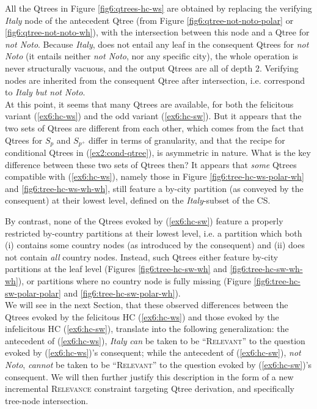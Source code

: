 All the Qtrees in Figure \ref{fig6:qtrees-hc-ws} are obtained by replacing the verifying \textit{Italy} node of the antecedent Qtree (from Figure \ref{fig6:qtree-not-noto-polar} or \ref{fig6:qtree-not-noto-wh}), with the intersection between this node and a Qtree for \textit{\textit{not Noto}}. Because \textit{Italy}, does not entail any leaf in the consequent Qtrees for \textit{not Noto} (it entails neither \textit{not Noto}, nor any specific city), the whole operation is never structurally vacuous, and the output Qtrees are all of depth $2$. Verifying nodes are inherited from the consequent Qtree after intersection, i.e. correspond to \textit{Italy but not Noto}.\\


At this point, it seems that many Qtrees are available, for both the felicitous variant (\ref{ex6:hc-ws}) and the odd variant (\ref{ex6:hc-sw}). But it appears that the two sets of Qtrees are different from each other, which comes from the fact that Qtrees for $S_p$ and $S_{p^+}$ differ in terms of granularity, and that the recipe for conditional Qtrees in (\ref{ex2:cond-qtree}), is asymmetric in nature. What is the key difference between these two sets of Qtrees then? It appears that \textit{some} Qtrees compatible with (\ref{ex6:hc-ws}), namely those in Figure \ref{fig6:tree-hc-ws-polar-wh} and \ref{fig6:tree-hc-ws-wh-wh}, still feature a by-city partition (as conveyed by the consequent) at their lowest level, defined on the \textit{Italy}-subset of the CS.


By contrast, none of the Qtrees evoked by (\ref{ex6:hc-sw}) feature a properly restricted by-country partitions at their lowest level, i.e. a partition which both (i) contains some country nodes (as introduced by the consequent) and (ii) does not contain \textit{all} country nodes. Instead, such Qtrees either feature by-city partitions at the leaf level (Figures \ref{fig6:tree-hc-sw-wh} and \ref{fig6:tree-hc-sw-wh-wh}), or partitions where no country node is fully missing (Figure \ref{fig6:tree-hc-sw-polar-polar} and \ref{fig6:tree-hc-sw-polar-wh}).\\

We will see in the next Section, that these observed differences between the Qtrees evoked by the felicitous HC (\ref{ex6:hc-ws}) and those evoked by the infelicitous HC (\ref{ex6:hc-sw}), translate into the following generalization: the antecedent of (\ref{ex6:hc-ws}), \textit{Italy} \textit{can} be taken to be ``\textsc{Relevant}'' to the question evoked by (\ref{ex6:hc-ws})'s consequent; while the antecedent of (\ref{ex6:hc-sw}), \textit{not Noto}, \textit{cannot} be taken to be ``\textsc{Relevant}'' to the question evoked by (\ref{ex6:hc-sw})'s consequent. We will then further justify this description in the form of a new incremental \textsc{Relevance} constraint targeting Qtree derivation, and specifically tree-node intersection.


